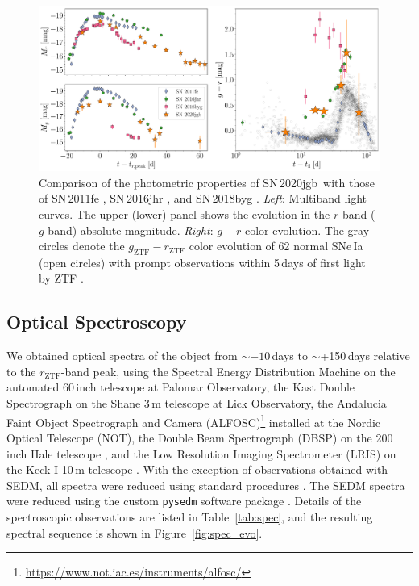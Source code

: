 \documentclass[twocolumn]{aastex631}
\newcommand{\sn}{SN\,2020jgb}
\begin{document}
\begin{figure}
    \centering
    \includegraphics[width=\textwidth]{photometry.pdf}
    \caption{Comparison of the photometric properties of \sn\ with those of SN\,2011fe \citep[normal SN\,Ia;][]{Pereira_2013}, SN\,2016jhr \citep[normal-luminosity He-shell DDet;][]{jiang_16jhr_2017}, and SN\,2018byg \citep[subluminous He-shell DDet;][]{de_18byg_2019}. \textit{Left}: Multiband light curves. The upper (lower) panel shows the evolution in the $r$-band ($g$-band) absolute magnitude. \textit{Right}: $g-r$ color evolution. The gray circles denote the $g_\mathrm{ZTF}-r_\mathrm{ZTF}$ color evolution of 62 normal SNe\,Ia (open circles) with prompt observations within 5\,days of first light by ZTF \citep{Bulla2020}.}
    \label{fig:photometry}
\end{figure}

\subsection{Optical Spectroscopy}\label{sec:optical_spec}
We obtained optical spectra of the object from $\sim$$-10$\,days to $\sim$+150\,days relative to the $r_\mathrm{ZTF}$-band peak, using the Spectral Energy Distribution Machine \citep[SEDM;][]{SEDM_2018} on the automated 60\,inch telescope \citep[P60;][]{P60_2006} at Palomar Observatory, the Kast Double Spectrograph \citep{miller1994kast} on the Shane 3\,m telescope at Lick Observatory, the Andalucia Faint Object Spectrograph and Camera (ALFOSC)\footnote{\url{https://www.not.iac.es/instruments/alfosc/}} installed at the Nordic Optical Telescope (NOT), the Double Beam Spectrograph (DBSP) on the 200\,inch Hale telescope \citep[P200;][]{P200_1982}, and the Low Resolution Imaging Spectrometer (LRIS) on the Keck-I 10\,m telescope \citep{Keck_1995}. With the exception of observations obtained with SEDM, all spectra were reduced using standard procedures \citep[e.g.,][]{Matheson_2000}. The SEDM spectra were reduced using the custom \texttt{pysedm} software package \citep{Rigault_pysedm_2019}. Details of the spectroscopic observations are listed in Table~\ref{tab:spec}, and the resulting spectral sequence is shown in Figure~\ref{fig:spec_evo}.
\end{document}

